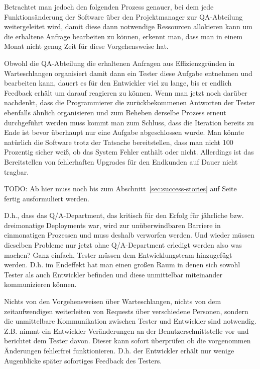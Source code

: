 Betrachtet man jedoch den folgenden Prozess genauer, bei dem jede
Funktionsänderung der Software über den Projektmanager zur QA-Abteilung
weitergeleitet wird, damit diese dann notwendige Ressourcen allokieren kann um
die erhaltene Anfrage bearbeiten zu können, erkennt man, dass man in einem
Monat nicht genug Zeit für diese Vorgehensweise hat.

Obwohl die QA-Abteilung die erhaltenen Anfragen aus Effizienzgründen in
Warteschlangen organisiert damit dann ein Tester diese Aufgabe entnehmen und
bearbeiten kann, dauert es für den Entwickler viel zu lange, bis er endlich
Feedback erhält um darauf reagieren zu können. Wenn man jetzt noch darüber
nachdenkt, dass die Programmierer die zurückbekommenen Antworten der Tester
ebenfalls ähnlich organisieren und zum Beheben derselbe Prozess erneut
durchgeführt werden muss kommt man zum Schluss, dass die Iteration bereits zu
Ende ist bevor überhaupt nur eine Aufgabe abgeschlossen wurde. Man könnte
natürlich die Software trotz der Tatsache bereitstellen, dass man nicht 100
Prozentig sicher weiß, ob das System Fehler enthält oder nicht. Allerdings ist
das Bereitstellen von fehlerhaften Upgrades für den Endkunden auf Dauer nicht
tragbar.

\begin{wichtigbox}
TODO: Ab hier muss noch bis zum Abschnitt~\ref{sec:success-stories} auf
Seite~\pageref{sec:success-stories} fertig ausformuliert werden.
\end{wichtigbox}

D.h., dass das Q/A-Department, das kritisch für den Erfolg für jährliche bzw.
dreimonatige Deployments war, wird zur unüberwindbaren Barriere in
einmonatigen Prozessen und muss deshalb verworfen werden. Und wieder müssen
dieselben Probleme nur jetzt ohne Q/A-Department erledigt werden also was
machen? Ganz einfach, Tester müssen dem Entwicklungsteam hinzugefügt werden.
D.h. im Endeffekt hat man einen großen Raum in denen sich sowohl Tester als
auch Entwickler befinden und diese unmittelbar miteinander kommunizieren
können.

Nichts von den Vorgehensweisen über Warteschlangen, nichts von dem
zeitaufwendigen weiterleiten von Requests über verschiedene Personen, sondern
die unmittelbare Kommunikation zwischen Tester und Entwickler sind notwendig.
Z.B. nimmt ein Entwickler Veränderungen an der Benutzerschnittstelle vor und
berichtet dem Tester davon. Dieser kann sofort überprüfen ob die vorgenommen
Änderungen fehlerfrei funktionieren. D.h. der Entwickler erhält nur wenige
Augenblicke später sofortiges Feedback des Testers.

